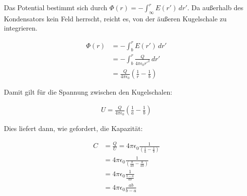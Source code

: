 \documentclass[a4paper,german,12pt,smallheadings]{scrartcl}
\begin{document}
Das Potential bestimmt sich durch $\Phi(r) = -\int_\infty^r E(r')\, dr'$. Da
außerhalb des Kondensators kein Feld herrscht, reicht es, von der äußeren
Kugelschale zu integrieren.

\begin{align*}
  \Phi(r) &= -\int_{b}^r E(r')\, dr' \\
          &= -\int_{b}^r \frac{Q}{4 \pi \epsilon_0 r'^2}\, dr' \\
          &= \frac{Q}{4\pi \epsilon_0} \left(\frac{1}{r}-\frac{1}{b}\right)
\end{align*}

Damit gilt für die Spannung zwischen den Kugelschalen:

\begin{align*}
  U = \frac{Q}{4\pi \epsilon_0} \left(\frac{1}{a}-\frac{1}{b}\right)
\end{align*}

Dies liefert dann, wie gefordert, die Kapazität:

\begin{align*}
  C &= \frac{Q}{U} =  4\pi \epsilon_0 \frac{1}{\left(\frac{1}{a}-\frac{1}{b}\right)} \\
    &=  4\pi \epsilon_0 \frac{1}{\left(\frac{b}{ab}-\frac{a}{ab}\right)} \\
    &=  4\pi \epsilon_0 \frac{1}{\frac{b-a}{ab}} \\
    &=  4\pi \epsilon_0 \frac{ab}{b-a}
\end{align*}
\end{document}
